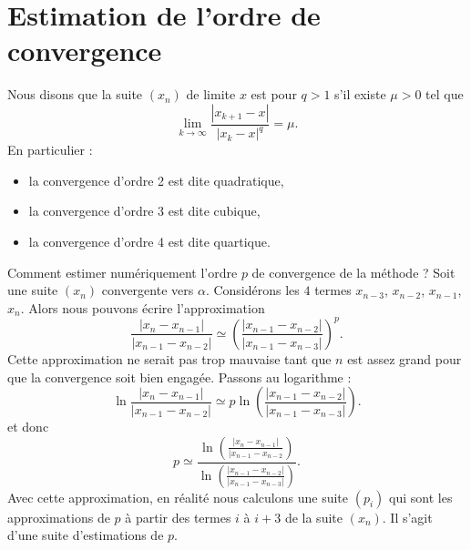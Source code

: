 
\section{Estimation de l'ordre de convergence}

\begin{definition}
    Nous disons que la suite \( (x_n)\) de limite \( x\) est  pour $q>1$ s'il existe \( \mu>0\) tel que
    \begin{equation}
        \lim_{k\to \infty} \frac{ | x_{k+1}-x | }{ | x_k-x |^q }=\mu.
    \end{equation}
    En particulier :
    \begin{itemize}
        \item
    la convergence d'ordre 2 est dite quadratique,
        \item
    la convergence d'ordre 3 est dite cubique,
        \item 
    la convergence d'ordre 4 est dite quartique.
    \end{itemize}
\end{definition}

Comment estimer numériquement l'ordre \( p\) de convergence de la méthode ? Soit une suite \( (x_n)\) convergente vers \( \alpha\). Considérons les \( 4\) termes \( x_{n-3}\), \( x_{n-2}\), \( x_{n-1}\), \( x_n\). Alors nous pouvons écrire l'approximation
\begin{equation}
    \frac{ | x_n -x_{n-1}| }{ | x_{n-1}-x_{n-2} | }\simeq \left( \frac{ | x_{n-1}-x_{n-2} | }{ | x_{n-1}-x_{n-3} | } \right)^p.
\end{equation}
Cette approximation ne serait pas trop mauvaise tant que \( n\) est assez grand pour que la convergence soit bien engagée. Passons au logarithme :
\begin{equation}
    \ln \frac{ | x_n -x_{n-1}| }{ | x_{n-1}-x_{n-2} | }\simeq p\ln \left( \frac{ | x_{n-1}-x_{n-2} | }{ | x_{n-1}-x_{n-3} | } \right).
\end{equation}
et donc
\begin{equation}
    p\simeq \frac{ \ln\left( \frac{ | x_n -x_{n-1}| }{ | x_{n-1}-x_{n-2} } \right) }{ \ln \left(\frac{ | x_{n-1}-x_{n-2} | }{ | x_{n-1}-x_{n-3} | } \right)}.
\end{equation}
Avec cette approximation, en réalité nous calculons une suite \( (p_i)\) qui sont les approximations de \( p\) à partir des termes \( i\) à \(i+3 \) de la suite \( (x_n)\). Il s'agit d'une suite d'estimations de \( p\).

